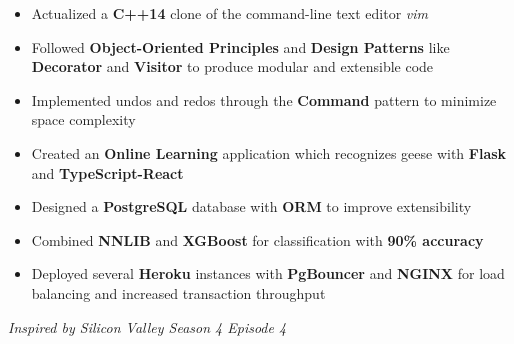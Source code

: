 \documentclass[10pt,a4paper,ragged2e]{altacv}
\begin{document}
\divider

\begin{itemize}
    \item Actualized a \textbf{C++14} clone of the command-line text editor \textit{vim}
    \item Followed \textbf{Object-Oriented Principles} and \textbf{Design Patterns} like \textbf{Decorator} and \textbf{Visitor} to produce modular and extensible code
    \item Implemented undos and redos through the \textbf{Command} pattern to minimize space complexity
\end{itemize}

\divider

\begin{itemize}
    \item Created an \textbf{Online Learning} application which recognizes geese with \textbf{Flask} and \textbf{TypeScript-React}
    \item Designed a \textbf{PostgreSQL} database with \textbf{ORM} to improve extensibility
    \item Combined \textbf{NNLIB} and \textbf{XGBoost} for classification with \textbf{90\% accuracy}
    \item Deployed several \textbf{Heroku} instances with \textbf{PgBouncer} and \textbf{NGINX} for load balancing and increased transaction throughput
\end{itemize}
\textit{Inspired by Silicon Valley Season 4 Episode 4}

\divider
\end{document}
